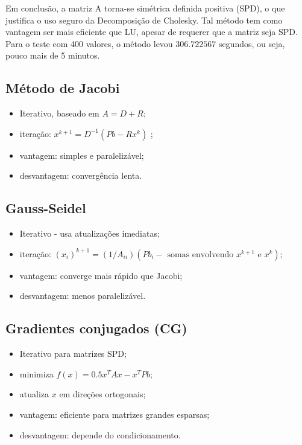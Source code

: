 \documentclass{article} %
\theoremstyle{definition}
\begin{document}
                Em conclusão, a matriz A torna-se simétrica definida positiva
                (SPD), o que justifica o uso seguro da Decomposição de Cholesky.
                Tal método tem como vantagem ser mais eficiente que LU, apesar de requerer que a 
                matriz seja SPD.
                Para o teste com 400 valores, o método levou $306.722567$ segundos, ou seja, 
                pouco mais de 5 minutos.


        \subsection*{Método de Jacobi}
            \begin{itemize}
                \item Iterativo, baseado em $A = D + R$;
                \item iteração:  $x^{k+1} = D^{-1} \left( Pb - Rx^k \right) $ ;
                \item vantagem: simples e paralelizável;
                \item desvantagem: convergência lenta.
            \end{itemize}
        \subsection*{Gauss-Seidel}
            \begin{itemize}
                \item Iterativo - usa atualizações imediatas;
                \item iteração: $(x_i)^{k+1} = \left( 1/A_{ii} \right)
                    \left( Pb_i - \text{ somas envolvendo } x^{k+1} \text{ e } x^k \right) $;
                \item vantagem: converge mais rápido que Jacobi;
                \item desvantagem: menos paralelizável.
            \end{itemize}

        \subsection*{Gradientes conjugados (CG)}

            \begin{itemize}
                \item Iterativo para matrizes SPD;
                \item minimiza $f\left( x \right) = 0.5x^T Ax - x^T Pb$;
                \item atualiza $x$ em direções ortogonais;
                \item vantagem: eficiente para matrizes grandes esparsas;
                \item desvantagem: depende do condicionamento.
            \end{itemize}
\end{document}
